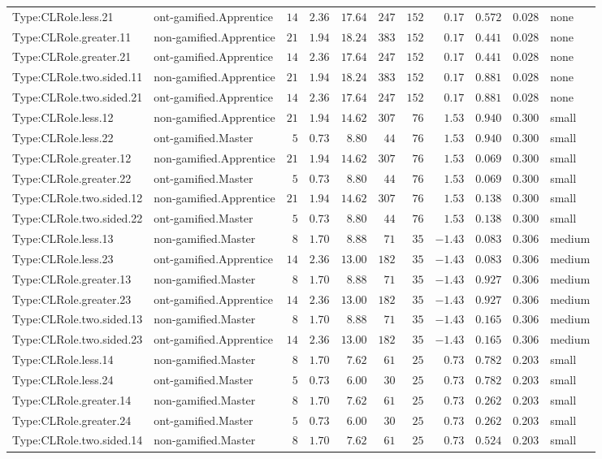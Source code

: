 \documentclass[6pt,a4paper]{article}
\begin{document}
{\begin{longtable}{llrrrrrrrrl}
Type:CLRole.less.21&ont-gamified.Apprentice&$14$&$2.36$&$17.64$&$247$&$152$&$ 0.17$&$0.572$&$0.028$&none\tabularnewline
Type:CLRole.greater.11&non-gamified.Apprentice&$21$&$1.94$&$18.24$&$383$&$152$&$ 0.17$&$0.441$&$0.028$&none\tabularnewline
Type:CLRole.greater.21&ont-gamified.Apprentice&$14$&$2.36$&$17.64$&$247$&$152$&$ 0.17$&$0.441$&$0.028$&none\tabularnewline
Type:CLRole.two.sided.11&non-gamified.Apprentice&$21$&$1.94$&$18.24$&$383$&$152$&$ 0.17$&$0.881$&$0.028$&none\tabularnewline
Type:CLRole.two.sided.21&ont-gamified.Apprentice&$14$&$2.36$&$17.64$&$247$&$152$&$ 0.17$&$0.881$&$0.028$&none\tabularnewline
Type:CLRole.less.12&non-gamified.Apprentice&$21$&$1.94$&$14.62$&$307$&$ 76$&$ 1.53$&$0.940$&$0.300$&small\tabularnewline
Type:CLRole.less.22&ont-gamified.Master&$ 5$&$0.73$&$ 8.80$&$ 44$&$ 76$&$ 1.53$&$0.940$&$0.300$&small\tabularnewline
Type:CLRole.greater.12&non-gamified.Apprentice&$21$&$1.94$&$14.62$&$307$&$ 76$&$ 1.53$&$0.069$&$0.300$&small\tabularnewline
Type:CLRole.greater.22&ont-gamified.Master&$ 5$&$0.73$&$ 8.80$&$ 44$&$ 76$&$ 1.53$&$0.069$&$0.300$&small\tabularnewline
Type:CLRole.two.sided.12&non-gamified.Apprentice&$21$&$1.94$&$14.62$&$307$&$ 76$&$ 1.53$&$0.138$&$0.300$&small\tabularnewline
Type:CLRole.two.sided.22&ont-gamified.Master&$ 5$&$0.73$&$ 8.80$&$ 44$&$ 76$&$ 1.53$&$0.138$&$0.300$&small\tabularnewline
Type:CLRole.less.13&non-gamified.Master&$ 8$&$1.70$&$ 8.88$&$ 71$&$ 35$&$-1.43$&$0.083$&$0.306$&medium\tabularnewline
Type:CLRole.less.23&ont-gamified.Apprentice&$14$&$2.36$&$13.00$&$182$&$ 35$&$-1.43$&$0.083$&$0.306$&medium\tabularnewline
Type:CLRole.greater.13&non-gamified.Master&$ 8$&$1.70$&$ 8.88$&$ 71$&$ 35$&$-1.43$&$0.927$&$0.306$&medium\tabularnewline
Type:CLRole.greater.23&ont-gamified.Apprentice&$14$&$2.36$&$13.00$&$182$&$ 35$&$-1.43$&$0.927$&$0.306$&medium\tabularnewline
Type:CLRole.two.sided.13&non-gamified.Master&$ 8$&$1.70$&$ 8.88$&$ 71$&$ 35$&$-1.43$&$0.165$&$0.306$&medium\tabularnewline
Type:CLRole.two.sided.23&ont-gamified.Apprentice&$14$&$2.36$&$13.00$&$182$&$ 35$&$-1.43$&$0.165$&$0.306$&medium\tabularnewline
Type:CLRole.less.14&non-gamified.Master&$ 8$&$1.70$&$ 7.62$&$ 61$&$ 25$&$ 0.73$&$0.782$&$0.203$&small\tabularnewline
Type:CLRole.less.24&ont-gamified.Master&$ 5$&$0.73$&$ 6.00$&$ 30$&$ 25$&$ 0.73$&$0.782$&$0.203$&small\tabularnewline
Type:CLRole.greater.14&non-gamified.Master&$ 8$&$1.70$&$ 7.62$&$ 61$&$ 25$&$ 0.73$&$0.262$&$0.203$&small\tabularnewline
Type:CLRole.greater.24&ont-gamified.Master&$ 5$&$0.73$&$ 6.00$&$ 30$&$ 25$&$ 0.73$&$0.262$&$0.203$&small\tabularnewline
Type:CLRole.two.sided.14&non-gamified.Master&$ 8$&$1.70$&$ 7.62$&$ 61$&$ 25$&$ 0.73$&$0.524$&$0.203$&small\tabularnewline

\end{longtable}}
\end{document}
